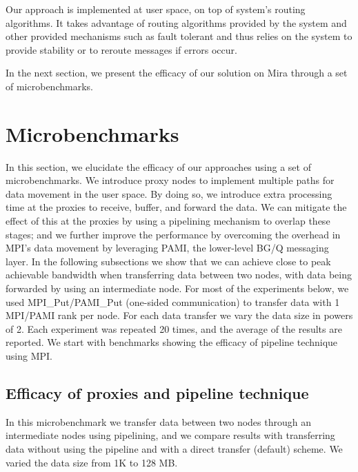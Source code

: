 \documentclass[final,5p,times]{elsarticle}
\begin{document}
Our approach is implemented at user space, on top of system's routing algorithms. It takes advantage of routing algorithms provided by the system and other provided mechanisms such as fault tolerant and thus relies on the system to provide stability or to reroute messages if errors occur.

In the next section, we present the efficacy of our solution on Mira through a set of microbenchmarks.

\section{Microbenchmarks}
\label{sec:microbenchmark}
In this section, we elucidate the efficacy of our approaches using a set of microbenchmarks.
We introduce proxy nodes to implement multiple paths for data movement in the user space. By doing so, we introduce extra processing time at the proxies to receive, buffer, and forward the data. We can mitigate the effect of this at the proxies by using a pipelining mechanism to overlap these stages; and we further improve the performance by overcoming the overhead in MPI's data movement by leveraging PAMI, the lower-level BG/Q messaging layer.
In the following subsections we show that we can achieve close to peak achievable bandwidth when transferring data between two nodes, with data being forwarded by using an intermediate node. For most of the experiments below, we used MPI\_Put/PAMI\_Put (one-sided communication) to transfer data with 1 MPI/PAMI rank per node. For each data transfer we vary the data size in powers of 2. Each experiment was repeated 20 times, and the average of the results are reported. We start with benchmarks showing the efficacy of pipeline technique using MPI.

\subsection{Efficacy of proxies and pipeline technique}

In this microbenchmark we transfer data between two nodes through an intermediate nodes using pipelining, and we compare results with transferring data without using the pipeline and with a direct transfer (default) scheme. We varied the data size from 1K  to 128 MB.
\end{document}
